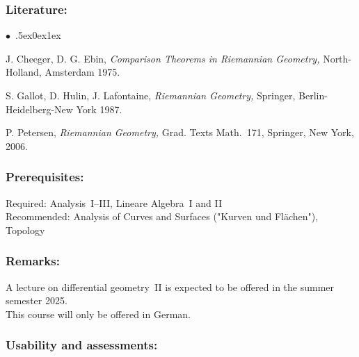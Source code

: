 \documentclass[a4paper,10pt]{article}
\renewenvironment{itemize}{\begin{list}{$\bullet$\ }{\itemsep.5ex\setlength{\topsep}{0.5\itemsep}\parsep0ex\labelsep1ex\settowidth{\labelwidth}{$\bullet$\ }\setlength{\leftmargin}{\labelwidth}\addtolength{\leftmargin}{3ex}\addtolength{\leftmargin}{\labelsep}}}{\end{list}}
\begin{document}
\subsubsection*{\large
    Literature:
}
\begin{itemize}
\item{J. Cheeger, D. G. Ebin, {\em Comparison Theorems in Riemannian Geometry,\/} North-Holland, Amsterdam 1975.}
\item{S. Gallot, D. Hulin, J. Lafontaine, {\em Riemannian Geometry,\/} Springer, Berlin-Heidelberg-New York 1987.}
\item{P. Petersen, {\em Riemannian Geometry,\/} Grad. Texts Math.~171, Springer, New York, 2006.}
\end{itemize}
\subsubsection*{\large
    Prerequisites:
}
Required: Analysis~I–III, Lineare Algebra~I and II \\
Recommended: Analysis of Curves and Surfaces ("Kurven und Flächen"), Topology
\subsubsection*{\large
    Remarks:
}
A lecture on differential geometry~II is expected to be offered in the summer semester 2025. \\
This course will only be offered in German.
\cleardoublepage
\subsubsection*{\large
    Usability and assessments:
}
\end{document}
